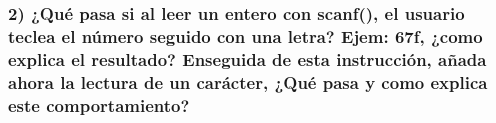 \subsubsection*{2) ¿Qué pasa si al leer un entero con scanf(), el usuario teclea el número seguido con una letra? Ejem: 67f, ¿como explica el resultado? Enseguida de esta instrucción, añada ahora la lectura de un carácter, ¿Qué pasa y como explica este comportamiento?}